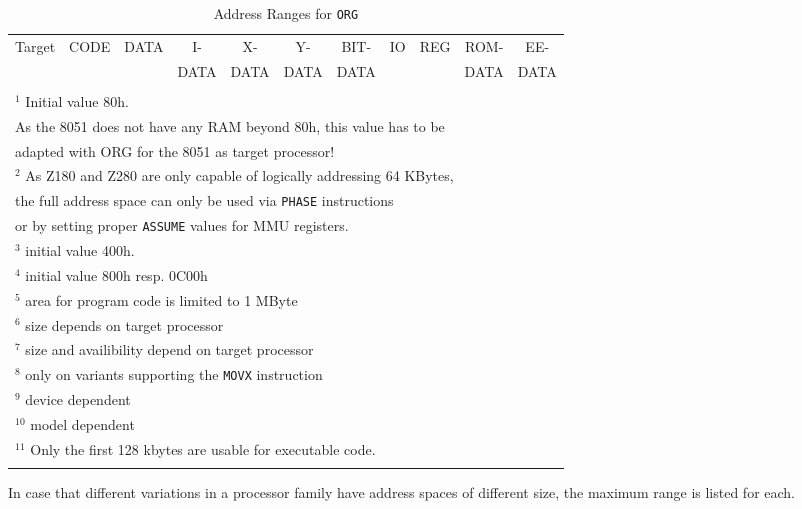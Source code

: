 \documentclass[12pt,twoside]{report}
\newcommand{\tty}[1]{{\tt #1}}
\newcommand{\tin}[1]{{\scriptsize #1}}
\begin{document}
\hfuzz=60pt
\small
\begin{longtable}{|l|c|c|c|c|c|c|c|c|c|c|}
\hline
\tin{Target} & \tin{CODE} & \tin{DATA} & \tin{I-}   & \tin{X-}   & \tin{Y-}   & \tin{BIT-} & \tin{IO} & \tin{REG} & \tin{ROM-}  & \tin{EE-}  \\
             &            &            & \tin{DATA} & \tin{DATA} & \tin{DATA} & \tin{DATA} &          &           & \tin{DATA}  & \tin{DATA} \\
\hline
\hline
\endhead

\\ \hline
\multicolumn{11}{|l|}{$^{1}$ Initial value 80h.} \\
\multicolumn{11}{|l|}{   As the 8051 does not have any RAM beyond 80h, this value has to be} \\
\multicolumn{11}{|l|}{   adapted with ORG for the 8051 as target processor!}\\
\hline
\multicolumn{11}{|l|}{$^{2}$ As Z180 and Z280 are only capable of logically addressing 64 KBytes,}\\
\multicolumn{11}{|l|}{   the full address space can only be used via \tty{PHASE} instructions}\\
\multicolumn{11}{|l|}{   or by setting proper \tty{ASSUME} values for MMU registers.}\\
\hline
\multicolumn{11}{|l|}{$^{3}$ initial value 400h.}\\
\hline
\multicolumn{11}{|l|}{$^{4}$ initial value 800h resp. 0C00h} \\
\hline
\multicolumn{11}{|l|}{$^{5}$ area for program code is limited to 1 MByte} \\
\hline
\multicolumn{11}{|l|}{$^{6}$ size depends on target processor} \\
\hline
\multicolumn{11}{|l|}{$^{7}$ size and availibility depend on target processor} \\
\hline
\multicolumn{11}{|l|}{$^{8}$ only on variants supporting the \tty{MOVX} instruction} \\
\hline
\multicolumn{11}{|l|}{$^{9}$ device dependent} \\
\hline
\multicolumn{11}{|l|}{$^{10}$ model dependent} \\
\hline
\multicolumn{11}{|l|}{$^{11}$ Only the first 128 kbytes are usable for executable code.} \\
\hline
\caption{Address Ranges for \tty{ORG}}
\label{TabORG}
\end{longtable}
\normalsize
\hfuzz=0pt

In case that different variations in a processor family have address
spaces of different size, the maximum range is listed for each.
\end{document}
